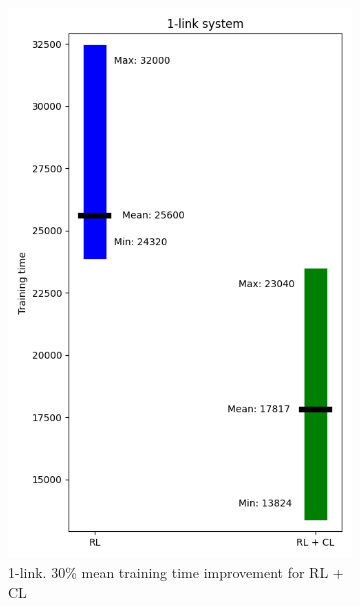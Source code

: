 \begin{figure}[h!]
	\centering
	\begin{subfigure}[t]{0.48\textwidth}
		\centering
		\includegraphics[width=\textwidth]{Figures/1_link_comparison.png}
		\caption{1-link. 30\% mean training time improvement for RL + CL}
	\end{subfigure}
	\begin{subfigure}[t]{0.48\textwidth}
		\centering

\end{subfigure}
\end{figure}
